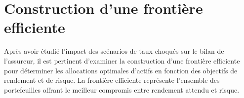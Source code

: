 \chapter{Construction d'une frontière efficiente}
\label{chap:construction_d_une_frontiere_efficiente}

Après avoir étudié l'impact des scénarios de taux choqués sur le bilan de l'assureur, il est pertinent d'examiner la construction d'une frontière efficiente pour déterminer les allocations optimales d'actifs en fonction des objectifs de rendement et de risque. La frontière efficiente représente l'ensemble des portefeuilles offrant le meilleur compromis entre rendement attendu et risque.
 
